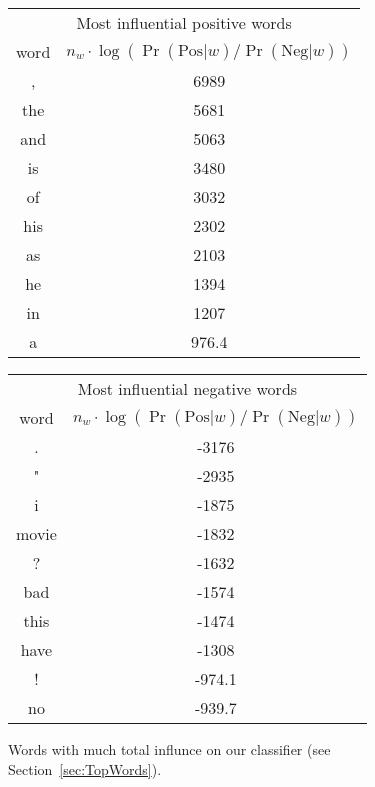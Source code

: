 \documentclass{article}
\newcommand{\PosC}{\mathrm{Pos}}
\newcommand{\NegC}{\mathrm{Neg}}
\begin{document}
\begin{figure}
\begin{tabular}{c|c}
    \multicolumn{2}{c}{Most influential positive words} \\
    word & \(n_w \cdot \log(\Pr(\PosC|w) / \Pr(\NegC|w))\) \\
    \hline
     , & 6989 \\
    the & 5681 \\
    and & 5063 \\
    is & 3480 \\
    of & 3032 \\
    his & 2302 \\
    as & 2103 \\
    he & 1394 \\
    in & 1207 \\
    a & 976.4
\end{tabular}
\begin{tabular}{c|c}
    \multicolumn{2}{c}{Most influential negative words} \\
    word & \(n_w \cdot \log(\Pr(\PosC|w) / \Pr(\NegC|w))\) \\
    \hline
    . & -3176 \\
    " & -2935 \\
    i & -1875 \\
    movie & -1832 \\
    ? & -1632 \\
    bad & -1574 \\
    this & -1474 \\
    have & -1308 \\
    ! & -974.1 \\
    no & -939.7
\end{tabular}
\caption{\label{fig:MostInfluentialWords} Words with much total influnce on our classifier (see Section~\ref{sec:TopWords}).}
\end{figure}
\end{document}
